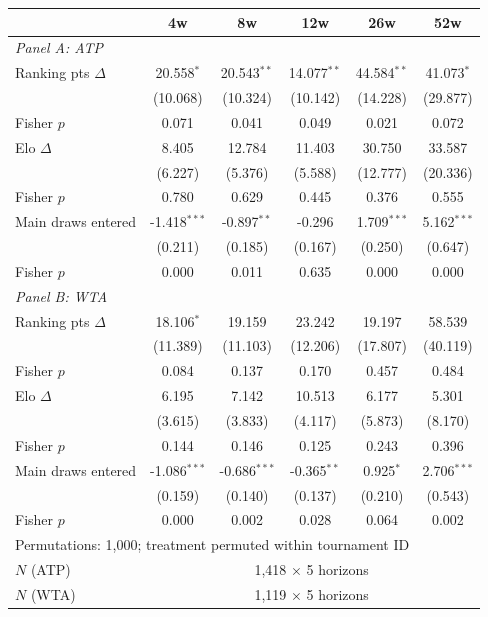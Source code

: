 \begin{tabular}{l ccccc}
\toprule
 & 4w & 8w & 12w & 26w & 52w \\
\midrule
\multicolumn{6}{l}{\textit{Panel A: ATP}} \\
\midrule
Ranking pts $\Delta$ & 20.558$^{*}$ & 20.543$^{**}$ & 14.077$^{**}$ & 44.584$^{**}$ & 41.073$^{*}$ \\
  & (10.068) & (10.324) & (10.142) & (14.228) & (29.877) \\
  Fisher $p$ & 0.071 & 0.041 & 0.049 & 0.021 & 0.072 \\[0.3em]
Elo $\Delta$ & 8.405 & 12.784 & 11.403 & 30.750 & 33.587 \\
  & (6.227) & (5.376) & (5.588) & (12.777) & (20.336) \\
  Fisher $p$ & 0.780 & 0.629 & 0.445 & 0.376 & 0.555 \\[0.3em]
Main draws entered & -1.418$^{***}$ & -0.897$^{**}$ & -0.296 & 1.709$^{***}$ & 5.162$^{***}$ \\
  & (0.211) & (0.185) & (0.167) & (0.250) & (0.647) \\
  Fisher $p$ & 0.000 & 0.011 & 0.635 & 0.000 & 0.000 \\[0.3em]

\multicolumn{6}{l}{\textit{Panel B: WTA}} \\
\midrule
Ranking pts $\Delta$ & 18.106$^{*}$ & 19.159 & 23.242 & 19.197 & 58.539 \\
  & (11.389) & (11.103) & (12.206) & (17.807) & (40.119) \\
  Fisher $p$ & 0.084 & 0.137 & 0.170 & 0.457 & 0.484 \\[0.3em]
Elo $\Delta$ & 6.195 & 7.142 & 10.513 & 6.177 & 5.301 \\
  & (3.615) & (3.833) & (4.117) & (5.873) & (8.170) \\
  Fisher $p$ & 0.144 & 0.146 & 0.125 & 0.243 & 0.396 \\[0.3em]
Main draws entered & -1.086$^{***}$ & -0.686$^{***}$ & -0.365$^{**}$ & 0.925$^{*}$ & 2.706$^{***}$ \\
  & (0.159) & (0.140) & (0.137) & (0.210) & (0.543) \\
  Fisher $p$ & 0.000 & 0.002 & 0.028 & 0.064 & 0.002 \\[0.3em]
\midrule
\multicolumn{6}{l}{Permutations: 1,000; treatment permuted within tournament ID} \\
$N$ (ATP) & \multicolumn{5}{c}{1,418 $\times$ 5 horizons} \\
$N$ (WTA) & \multicolumn{5}{c}{1,119 $\times$ 5 horizons} \\
\bottomrule
\end{tabular}
